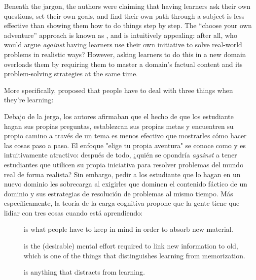 Beneath the jargon,
the authors were claiming that having learners ask their own questions,
set their own goals,
and find their own path through a subject
is less effective than showing them how to do things step by step.
The ``choose your own adventure'' approach is known as ,
and is intuitively appealing:
after all,
who would argue \emph{against} having learners use their own initiative
to solve real-world problems in realistic ways?
However,
asking learners to do this in a new domain overloads them
by requiring them to master a domain's factual content
and its problem-solving strategies
at the same time.

More specifically,
 proposed that
people have to deal with three things when they're learning:

Debajo de la jerga, los autores afirmaban que el hecho de que los estudiante hagan sus propias preguntas, establezcan sus propias metas y encuentren su propio camino a través de un tema es menos efectivo que mostrarles cómo hacer las cosas paso a paso. El enfoque "elige tu propia aventura" se conoce como  y es intuitivamente atractivo: después de todo, ¿quién se opondría \emph{against} a tener estudiantes que utilicen su propia iniciativa para resolver problemas del mundo real de forma realista? Sin embargo, pedir a los estudiante que lo hagan en un nuevo dominio les sobrecarga al exigirles que dominen el contenido fáctico de un dominio y sus estrategias de resolución de problemas al mismo tiempo.
Más específicamente, 
 la teoría de la carga cognitiva propone que la gente tiene que lidiar con tres cosas cuando está aprendiendo:


\begin{description}

\item[]
  is what people have to keep in mind in order to absorb new material.

\item[]
  is the (desirable) mental effort required to link new information to old,
  which is one of the things that distinguishes learning from memorization.

\item[]
  is anything that distracts from learning.

\end{description}

